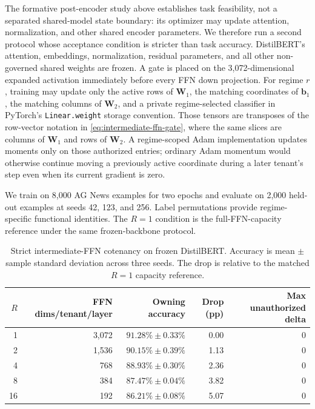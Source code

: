 \documentclass[11pt,a4paper]{article}
\newcommand{\bW}{\mathbf{W}}
\begin{document}
The formative post-encoder study above establishes task feasibility,
not a separated shared-model state boundary: its optimizer may update
attention, normalization, and other shared encoder parameters.  We
therefore run a second protocol whose acceptance condition is stricter
than task accuracy.  DistilBERT's attention, embeddings,
normalization, residual parameters, and all other non-governed shared
weights are frozen.  A gate is placed on the 3,072-dimensional
expanded activation immediately before every FFN down projection.
For regime $r$, training may update only the active rows of
$\bW_1$, the matching coordinates of $\mathbf{b}_1$, the matching
columns of $\bW_2$, and a private regime-selected classifier in
PyTorch's \texttt{Linear.weight} storage convention.  Those tensors
are transposes of the row-vector notation in
\eqref{eq:intermediate-ffn-gate}, where the same slices are columns of
$\bW_1$ and rows of $\bW_2$.
A regime-scoped Adam implementation updates moments only on those
authorized entries; ordinary Adam momentum would otherwise continue
moving a previously active coordinate during a later tenant's step
even when its current gradient is zero.

We train on 8,000 AG News examples for two epochs and evaluate on
2,000 held-out examples at seeds 42, 123, and 256.  Label
permutations provide regime-specific functional identities.  The
$R{=}1$ condition is the full-FFN-capacity reference under the same
frozen-backbone protocol.

\begin{table}[ht]
\centering
\caption{Strict intermediate-FFN cotenancy on frozen DistilBERT.
Accuracy is mean $\pm$ sample standard deviation across three seeds.
The drop is relative to the matched $R{=}1$ capacity reference.}
\label{tab:strict-dense-ffn}
\small
\begin{tabular}{@{}rrrrr@{}}
\toprule
$R$ & FFN dims/tenant/layer & Owning accuracy & Drop (pp) &
Max unauthorized delta \\
\midrule
1  & 3,072 & $91.28\%\pm0.33\%$ & 0.00 & 0 \\
2  & 1,536 & $90.15\%\pm0.39\%$ & 1.13 & 0 \\
4  &   768 & $88.93\%\pm0.30\%$ & 2.36 & 0 \\
8  &   384 & $87.47\%\pm0.04\%$ & 3.82 & 0 \\
16 &   192 & $86.21\%\pm0.08\%$ & 5.07 & 0 \\
\bottomrule
\end{tabular}
\end{table}
\end{document}
